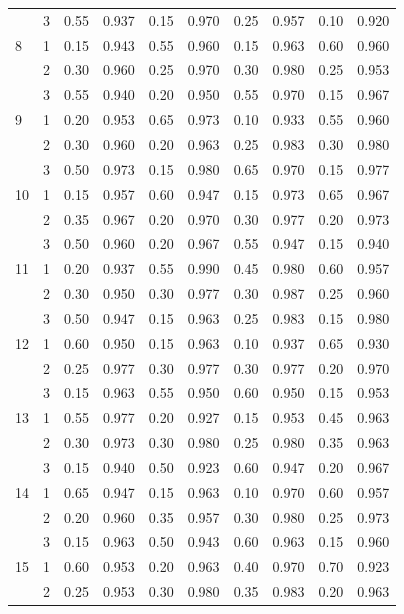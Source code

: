 \begin{longtable}{llcccccccc}
   & 3 & 0.55 & 0.937 & 0.15 & 0.970 & 0.25 & 0.957 & 0.10 & 0.920 \\ 
  8 & 1 & 0.15 & 0.943 & 0.55 & 0.960 & 0.15 & 0.963 & 0.60 & 0.960 \\ 
   & 2 & 0.30 & 0.960 & 0.25 & 0.970 & 0.30 & 0.980 & 0.25 & 0.953 \\ 
   & 3 & 0.55 & 0.940 & 0.20 & 0.950 & 0.55 & 0.970 & 0.15 & 0.967 \\ 
  9 & 1 & 0.20 & 0.953 & 0.65 & 0.973 & 0.10 & 0.933 & 0.55 & 0.960 \\ 
   & 2 & 0.30 & 0.960 & 0.20 & 0.963 & 0.25 & 0.983 & 0.30 & 0.980 \\ 
   & 3 & 0.50 & 0.973 & 0.15 & 0.980 & 0.65 & 0.970 & 0.15 & 0.977 \\ 
  10 & 1 & 0.15 & 0.957 & 0.60 & 0.947 & 0.15 & 0.973 & 0.65 & 0.967 \\ 
   & 2 & 0.35 & 0.967 & 0.20 & 0.970 & 0.30 & 0.977 & 0.20 & 0.973 \\ 
   & 3 & 0.50 & 0.960 & 0.20 & 0.967 & 0.55 & 0.947 & 0.15 & 0.940 \\ 
  11 & 1 & 0.20 & 0.937 & 0.55 & 0.990 & 0.45 & 0.980 & 0.60 & 0.957 \\ 
   & 2 & 0.30 & 0.950 & 0.30 & 0.977 & 0.30 & 0.987 & 0.25 & 0.960 \\ 
   & 3 & 0.50 & 0.947 & 0.15 & 0.963 & 0.25 & 0.983 & 0.15 & 0.980 \\ 
  12 & 1 & 0.60 & 0.950 & 0.15 & 0.963 & 0.10 & 0.937 & 0.65 & 0.930 \\ 
   & 2 & 0.25 & 0.977 & 0.30 & 0.977 & 0.30 & 0.977 & 0.20 & 0.970 \\ 
   & 3 & 0.15 & 0.963 & 0.55 & 0.950 & 0.60 & 0.950 & 0.15 & 0.953 \\ 
  13 & 1 & 0.55 & 0.977 & 0.20 & 0.927 & 0.15 & 0.953 & 0.45 & 0.963 \\ 
   & 2 & 0.30 & 0.973 & 0.30 & 0.980 & 0.25 & 0.980 & 0.35 & 0.963 \\ 
   & 3 & 0.15 & 0.940 & 0.50 & 0.923 & 0.60 & 0.947 & 0.20 & 0.967 \\ 
  14 & 1 & 0.65 & 0.947 & 0.15 & 0.963 & 0.10 & 0.970 & 0.60 & 0.957 \\ 
   & 2 & 0.20 & 0.960 & 0.35 & 0.957 & 0.30 & 0.980 & 0.25 & 0.973 \\ 
   & 3 & 0.15 & 0.963 & 0.50 & 0.943 & 0.60 & 0.963 & 0.15 & 0.960 \\ 
  15 & 1 & 0.60 & 0.953 & 0.20 & 0.963 & 0.40 & 0.970 & 0.70 & 0.923 \\ 
   & 2 & 0.25 & 0.953 & 0.30 & 0.980 & 0.35 & 0.983 & 0.20 & 0.963 \\ 

\end{longtable}
